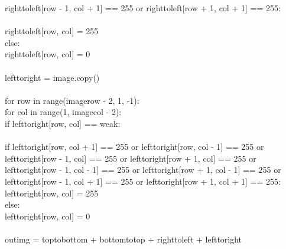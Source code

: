 \documentclass{article}
\begin{document}
	\indent \indent \indent \indent   right\textunderscore to\textunderscore left[row - 1, col + 1] == 255 or right\textunderscore to\textunderscore left[row + 1, col + 1] == 255:\\
	\\
	\indent \indent \indent \indent \indent right\textunderscore to\textunderscore left[row, col] = 255\\
	\indent \indent \indent \indent else:\\
	\indent \indent \indent \indent \indent right\textunderscore to\textunderscore left[row, col] = 0\\
	\\
	\indent left\textunderscore to\textunderscore right = image.copy()\\
	\\
	\indent for row in range(image\textunderscore row - 2, 1, -1):\\
	\indent \indent for col in range(1, image\textunderscore col - 2):\\
	\indent \indent \indent if left\textunderscore to\textunderscore right[row, col] == weak:\\
	\\
	\indent \indent \indent \indent if left\textunderscore to\textunderscore right[row, col + 1] == 255 or left\textunderscore to\textunderscore right[row, col - 1] == 255 or \\
	\indent \indent \indent \indent   left\textunderscore to\textunderscore right[row - 1, col] == 255 or left\textunderscore to\textunderscore right[row + 1, col] == 255 or \\
	\indent \indent \indent \indent   left\textunderscore to\textunderscore right[row - 1, col - 1] == 255 or left\textunderscore to\textunderscore right[row + 1, col - 1] == 255 or \\
	\indent \indent \indent \indent   left\textunderscore to\textunderscore right[row - 1, col + 1] == 255 or left\textunderscore to\textunderscore right[row + 1, col + 1] == 255:\\
	\indent \indent \indent \indent left\textunderscore to\textunderscore right[row, col] = 255\\
	\indent \indent \indent \indent else:\\
	\indent \indent \indent \indent \indent left\textunderscore to\textunderscore right[row, col] = 0\\
	\\
	\indent out\textunderscore img = top\textunderscore to\textunderscore bottom + bottom\textunderscore to\textunderscore top + right\textunderscore to\textunderscore left + left\textunderscore to\textunderscore right\\
\end{document}
